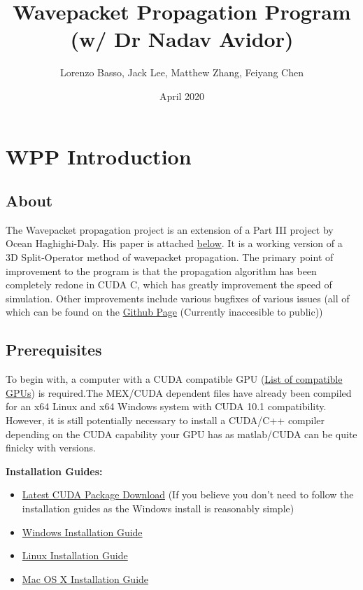 \documentclass[11pt,letterpaper]{article}
\title{Wavepacket Propagation Program (w/ Dr Nadav Avidor)}
\author{Lorenzo Basso, Jack Lee, Matthew Zhang, Feiyang Chen}
\date{April 2020}
\renewcommand{\\}{\bigskip}
\begin{document}
\maketitle

\tableofcontents


\pagestyle{fancy}
\renewcommand{\subsectionmark}[1]{\markright{#1}{}}
\fancyfoot[C]{\thepage}%
\fancyhead[L]{\leftmark}
\fancyhead[R]{\rightmark}

\newpage

\section{WPP Introduction}
\subsection{About}

The Wavepacket propagation project is an extension of a Part III project by Ocean Haghighi-Daly. His paper is attached \hyperref[sec:Oceanreport]{below}. It is a working version of a 3D Split-Operator method of wavepacket propagation. The primary point of improvement to the program is that the propagation algorithm has been completely redone in CUDA C, which has greatly improvement the speed of simulation. Other improvements include various bugfixes of various issues (all of which can be found on the \href{https://github.com/nextaeja/2020-WP-Project}{Github Page} (Currently inaccesible to public))


\subsection{Prerequisites}

To begin with, a computer with a CUDA compatible GPU (\href{https://developer.nvidia.com/cuda-gpus#compute}{List of compatible GPUs}) is required.The MEX/CUDA dependent files have already been compiled for an x64 Linux and x64 Windows system with CUDA 10.1 compatibility. However, it is still potentially necessary to install a CUDA/C++ compiler depending on the CUDA capability your GPU has as matlab/CUDA can be quite finicky with versions.\\



\textbf{Installation Guides:}

\begin{itemize}
    \item \href{https://developer.nvidia.com/cuda-downloads?target_os=Windows&target_arch=x86_64}{Latest CUDA Package Download} (If you believe you don't need to follow the installation guides as the Windows install is reasonably simple)
    \item \href{https://docs.nvidia.com/cuda/cuda-installation-guide-microsoft-windows/index.html}{Windows Installation Guide}
    \item \href{https://docs.nvidia.com/cuda/cuda-installation-guide-linux/index.html}{Linux Installation Guide}
    \item \href{https://docs.nvidia.com/cuda/cuda-installation-guide-mac-os-x/index.html}{Mac OS X Installation Guide}
\end{itemize}
\end{document}
